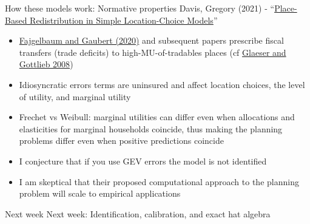 \documentclass[11pt,notes=hide,aspectratio=169]{beamer}
\begin{document}
\begin{frame}{How these models work: Normative properties}
Davis, Gregory (2021) - ``\href{https://www.nber.org/papers/w29045}{Place-Based Redistribution in Simple Location-Choice Models}''
\begin{itemize}
\item
\href{https://academic.oup.com/qje/article-abstract/135/2/959/5697213}{Fajgelbaum and Gaubert (2020)} and subsequent papers
prescribe fiscal transfers (trade deficits) to high-MU-of-tradables places
(cf \href{https://www.brookings.edu/wp-content/uploads/2008/03/2008a_bpea_glaeser.pdf}{Glaeser and Gottlieb 2008})
\item
Idiosyncratic errors terms are uninsured and affect location choices, the level of utility, and marginal utility
\item 
Frechet vs Weibull:
marginal utilities can differ even when allocations and elasticities for marginal households coincide,
thus making the planning problems differ even when positive predictions coincide
\item
I conjecture that if you use GEV errors the model is not identified
\item
I am skeptical that their proposed computational approach to the planning problem will scale to empirical applications
\end{itemize}
\end{frame}
\begin{frame}{Next week}
Next week: Identification, calibration, and exact hat algebra
\end{frame}
\end{document}
